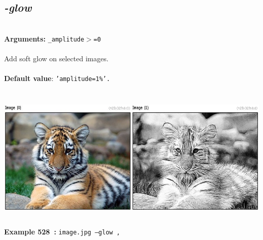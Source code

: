 \documentclass[a4paper,11pt,twoside]{book}
\begin{document}
\subsection{\emph{-glow} }\vspace*{-0.5em}
~\\\textbf{Arguments: } 
{\small \texttt{\_amplitude$>$=0}}\\~\\
Add soft glow on selected images.
~\\~\\\textbf{Default value}: {\small \texttt{'amplitude=1\%'.}}
\begin{center}\includegraphics[keepaspectratio=true,height=7cm,width=\textwidth]{img/gmic_def528.jpg}\\
{\footnotesize \textbf{Example 528~:} \texttt{image.jpg --glow ,}}
\end{center}
\end{document}
